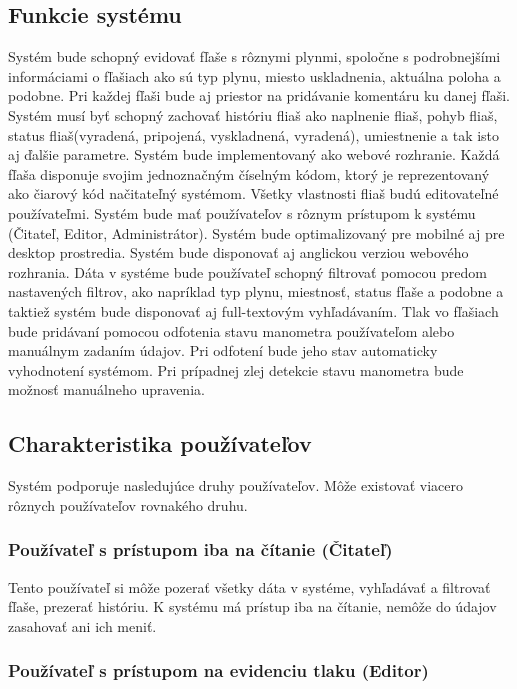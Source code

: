 \documentclass[hreffootnote]{zah}
\begin{document}
\subsection{Funkcie systému}
\label{gen:functions}
Systém bude schopný evidovať fľaše s rôznymi plynmi, spoločne s podrobnejšími informáciami o fľašiach ako sú typ plynu, miesto uskladnenia, aktuálna poloha a podobne. Pri každej fľaši bude aj priestor na pridávanie komentáru ku danej fľaši. Systém musí byť schopný zachovať históriu fliaš ako naplnenie fliaš, pohyb fliaš, status fliaš(vyradená, pripojená, vyskladnená, vyradená), umiestnenie a tak isto aj ďalšie parametre. Systém bude implementovaný ako webové rozhranie. Každá fľaša disponuje svojim jednoznačným číselným kódom, ktorý je reprezentovaný ako čiarový kód načitateľný systémom. Všetky vlastnosti fliaš budú editovateľné používateľmi. Systém bude mať používateľov s rôznym prístupom k systému (Čitateľ, Editor, Administrátor). Systém bude optimalizovaný pre mobilné aj pre desktop prostredia. Systém bude disponovať aj anglickou verziou webového rozhrania. Dáta v systéme bude používateľ schopný filtrovať pomocou predom nastavených filtrov, ako napríklad typ plynu, miestnosť, status fľaše a podobne a taktiež systém bude disponovať aj full-textovým vyhľadávaním. Tlak vo fľašiach bude pridávaní pomocou odfotenia stavu manometra používateľom alebo manuálnym zadaním údajov. Pri odfotení bude jeho stav automaticky vyhodnotení systémom. Pri prípadnej zlej detekcie stavu manometra bude možnosť manuálneho upravenia.

\subsection{Charakteristika používateľov}
\label{gen:users}

Systém podporuje nasledujúce druhy používateľov. Môže existovať viacero rôznych používateľov rovnakého druhu.

\subsubsection{Používateľ s prístupom iba na čítanie (Čitateľ)}
\label{gen:users:ro}

Tento používateľ si môže pozerať všetky dáta v systéme, vyhľadávať a filtrovať fľaše, prezerať históriu. K systému má prístup iba na čítanie, nemôže do údajov zasahovať ani ich meniť.

\subsubsection{Používateľ s prístupom na evidenciu tlaku (Editor)}
\label{gen:users:meter}
\end{document}
